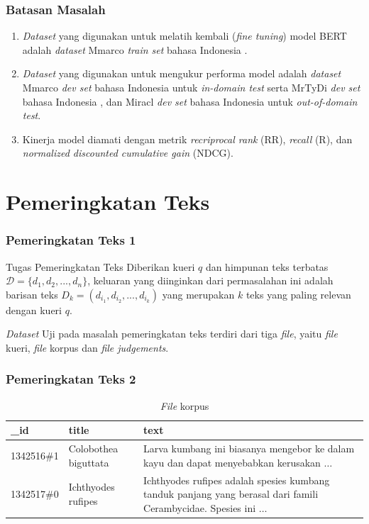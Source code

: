 \documentclass{beamer}
\newcommand{\f}[1]{\textit{#1}}
\begin{document}
\begin{frame}
    \frametitle{Batasan Masalah}
    \begin{enumerate}
    \item \f{Dataset} yang digunakan untuk melatih kembali (\f{fine tuning}) model BERT adalah \f{dataset} Mmarco \f{train set} bahasa Indonesia \citep{mmarco}.
	\item \f{Dataset} yang digunakan untuk mengukur performa model adalah \f{dataset} Mmarco \f{dev set} bahasa Indonesia \citep{mmarco} untuk \f{in-domain test} serta MrTyDi \f{dev set} bahasa Indonesia \citep{mrtydi}, dan Miracl \f{dev set} bahasa Indonesia \citep{miracl} untuk \f{out-of-domain test}.
	\item Kinerja model diamati dengan metrik \f{recriprocal rank} (RR), \f{recall} (R), dan \f{normalized discounted cumulative gain} (NDCG).
    \end{enumerate}
\end{frame}
    
\section{Pemeringkatan Teks}

\begin{frame}
\frametitle{Pemeringkatan Teks 1}

    \begin{block}{Tugas Pemeringkatan Teks}
        Diberikan kueri $q$ dan himpunan teks terbatas $\mathcal{D}= \{d_1, d_2, ..., d_n\}$, keluaran yang diinginkan dari permasalahan ini adalah barisan teks $D_k = (d_{i_1}, d_{i_2}, ..., d_{i_k})$ yang merupakan $k$ teks yang paling relevan dengan kueri $q$.
    \end{block}

    \noindent\f{Dataset} Uji pada masalah pemeringkatan teks terdiri dari tiga \f{file}, yaitu \f{file} kueri, \f{file} korpus dan \f{file judgements}.
\end{frame}


\begin{frame}
    \frametitle{Pemeringkatan Teks 2}
    \begin{table}[!ht]
        \centering
        \label{tab:contoh-file-korpus}
        \caption{\f{File} korpus}
        \begin{tabular}{|l|l|p{}|}
            \hline
            \textbf{\_id}    & \textbf{title}             & \textbf{text}                                                                                                 \\ \hline
            1342516\#1  & Colobothea biguttata & Larva kumbang ini biasanya mengebor ke dalam kayu dan dapat menyebabkan kerusakan $\dots$ \\ \hline
            1342517\#0  & Ichthyodes rufipes  & Ichthyodes rufipes adalah spesies kumbang tanduk panjang yang berasal dari famili Cerambycidae. Spesies ini $\dots$ \\ \hline
        \end{tabular}
    \end{table}
\end{frame}
\end{document}
